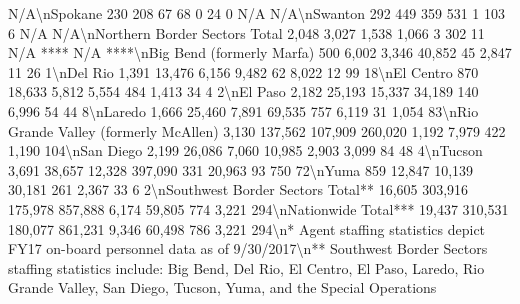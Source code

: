 \documentclass[
  12pt,
  openany]{book}
\newenvironment{Shaded}{\begin{snugshade}}{\end{snugshade}}
\begin{document}
\begin{Shaded}
\begin{Highlighting}[]
N/A\textbackslash{}nSpokane                                           230                208                       67                     68                 0               24               0              N/A      N/A\textbackslash{}nSwanton                                           292               449                       359                    531                 1               103               6             N/A      N/A\textbackslash{}nNorthern Border Sectors Total                    2,048             3,027                     1,538                  1,066                3               302              11        N/A ****    N/A   ****\textbackslash{}nBig Bend (formerly Marfa)                         500              6,002                     3,346                  40,852              45              2,847             11             26       1\textbackslash{}nDel Rio                                          1,391             13,476                    6,156                  9,482               62              8,022             12             99       18\textbackslash{}nEl Centro                                         870              18,633                    5,812                  5,554              484              1,413             34             4        2\textbackslash{}nEl Paso                                          2,182             25,193                   15,337                  34,189             140              6,996             54             44       8\textbackslash{}nLaredo                                           1,666             25,460                    7,891                  69,535             757              6,119             31            1,054     83\textbackslash{}nRio Grande Valley (formerly McAllen)             3,130            137,562                  107,909                 260,020            1,192             7,979            422            1,190    104\textbackslash{}nSan Diego                                        2,199             26,086                    7,060                  10,985            2,903             3,099             84             48       4\textbackslash{}nTucson                                           3,691             38,657                   12,328                 397,090             331             20,963             93            750       72\textbackslash{}nYuma                                              859              12,847                   10,139                  30,181             261              2,367             33             6        2\textbackslash{}nSouthwest Border Sectors Total**                16,605            303,916                  175,978                 857,888            6,174            59,805            774            3,221    294\textbackslash{}nNationwide Total***                             19,437            310,531                  180,077                 861,231            9,346            60,498            786            3,221    294\textbackslash{}n* Agent staffing statistics depict FY17 on{-}board personnel data as of 9/30/2017\textbackslash{}n** Southwest Border Sectors staffing statistics include: Big Bend, Del Rio, El Centro, El Paso, Laredo, Rio Grande Valley, San Diego, Tucson, Yuma, and the Special Operations 
\end{Highlighting}
\end{Shaded}
\end{document}
